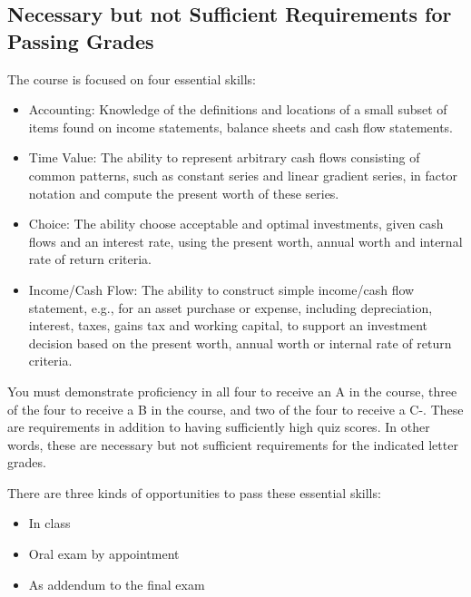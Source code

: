 \documentclass[letterpaper,10pt]{article}
\newif\ifonline
\begin{document}
\ifonline

\else
   \subsection{ Necessary but not Sufficient Requirements for Passing Grades}\label{sec:essentialSkills}
  
   The course is focused on four essential skills:
   
   \begin{itemize}
   
   \item Accounting: Knowledge of the definitions and locations of a
     small subset of items found on income statements, balance sheets and
     cash flow statements.
   
   \item Time Value: The ability to represent arbitrary cash flows
     consisting of common patterns, such as constant series and linear
     gradient series, in factor notation and compute the present worth of
     these series.
   
   \item Choice: The ability choose acceptable and optimal investments,
     given cash flows and an interest rate, using the present worth,
     annual worth and internal rate of return criteria.
   
   \item Income/Cash Flow: The ability to construct simple income/cash
     flow statement, e.g., for an asset purchase or expense, including
     depreciation, interest, taxes, gains tax and working capital, to
     support an investment decision based on the present worth, annual
     worth or internal rate of return criteria.
   \end{itemize}
   
  
  You must demonstrate proficiency in all four to receive an A in the course, three of the four to receive a B in the course, and two of the four to receive a C-.  These are requirements in addition to having sufficiently high quiz scores.  In other words, these are necessary but not sufficient requirements for the indicated letter grades.
  
  There are three kinds of opportunities to pass these essential skills:
  \begin{itemize}
      \item In class
      \item Oral exam by appointment
      \item As addendum to the final exam
  \end{itemize}
  
\end{document}
